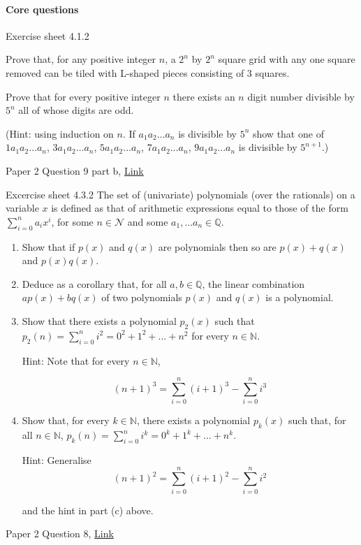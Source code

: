\documentclass{exam}
\begin{document}
\paragraph{Core questions}
\begin{questions}


\question Exercise sheet 4.1.2 

Prove that, for any positive integer $n$, a $2^n$ by $2^n$
square grid with any one square removed can be tiled
with L-shaped pieces consisting of 3 squares.


\question Prove that for every positive integer $n$ there exists an $n$ digit number divisible by $5^n$ all of whose digits are odd. 

(Hint: using induction on $n$. If $a_1a_2 \dots a_n$ is divisible by $5^n$ show that one of $1a_1a_2\dots a_n$, $3a_1a_2\dots a_n$, $5a_1a_2\dots a_n$, $7a_1a_2\dots a_n$, $9a_1a_2\dots a_n$ is divisible by $5^{n+1}$.)

 Paper 2 Question 9 part b, \href{http://www.cl.cam.ac.uk/teaching/exams/pastpapers/y2015p2q9.pdf}{Link}

\question Excercise sheet 4.3.2 The set of (univariate) polynomials (over the rationals) on a variable $x$ is defined as that of arithmetic
expressions equal to those of the form $\sum_{i=0}^n a_ix^i$, for some $n \in \mathcal{N}$ and some $a_1, \dots a_n \in \mathds{Q}$.
\begin{enumerate}[label=(\alph*)]
\item Show that if $p(x)$ and $q(x)$ are polynomials then so are $p(x) + q(x)$ and $p(x)q(x)$.

\item Deduce as a corollary that, for all $a, b \in \mathds{Q}$, the linear combination $ap(x)+bq(x)$ of two polynomials
$p(x)$ and $q(x)$ is a polynomial.

\item Show that there exists a polynomial $p_2(x)$ such that $p_2(n) = \sum_{i=0}^n i^2 = 0^2 + 1^2 + \dots + n^2$ for every $n \in \mathds{N}$.

Hint: Note that for every $n \in \mathds{N}$,

$$(n+1)^3 = \sum_{i=0}^n(i+1)^3 - \sum_{i=0}^n i^3$$

\item Show that, for every $k \in \mathds{N}$, there exists a polynomial $p_k(x)$ such that, for all $n \in \mathds{N}$, $p_k(n) = \sum_{i=0}^n i^k = 0^k + 1^k + \dots + n^k$.

Hint: Generalise $$(n + 1)^2 = \sum_{i=0}^n (i+1)^2 - \sum_{i=0}^n i^2$$

and the hint in part (c) above.
\end{enumerate} 

 Paper 2 Question 8, \href{https://www.cl.cam.ac.uk/teaching/exams/pastpapers/y2017p2q8.pdf}{Link}

\end{questions}
\end{document}
